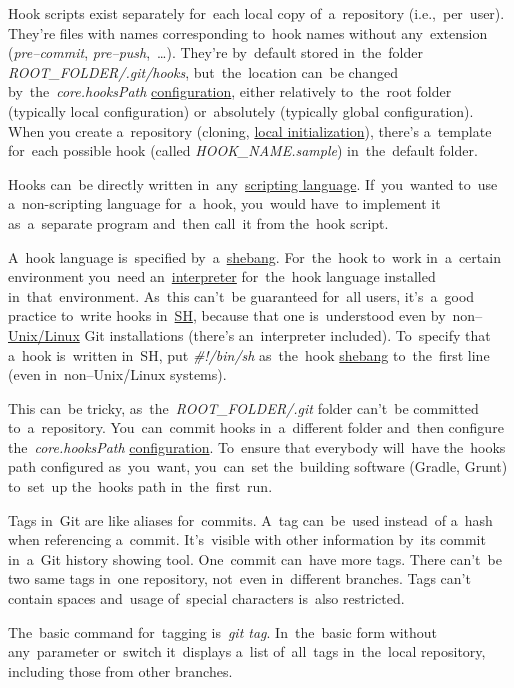 Hook scripts exist separately for~each local copy of~a~repository (i.e.,~per~user). They're files with names corresponding to~hook names without any~extension (\textit{pre--commit}, \textit{pre--push},~\dots). They're by~default stored in~the~folder \textit{ROOT\_FOLDER/.git/hooks}, but~the~location can~be changed by~the~\textit{core.hooksPath} \hyperref[gitconfig]{configuration}, either relatively to~the~root folder (typically local configuration) or~absolutely (typically global configuration). When you create a~repository (cloning, \hyperref[initrepo]{local initialization}), there's a~template for~each possible hook (called \textit{HOOK\_NAME.sample}) in~the~default folder.

Hooks can~be directly written in~any~\hyperref[scriptinglanguages]{scripting language}. If~you~wanted to~use a~non-scripting language for~a~hook, you~would have~to implement it as~a~separate program and~then call~it from the~hook script.

A~hook language is~specified by~a~\hyperref[shebang]{shebang}. For~the~hook to~work in~a~certain environment you~need an~\hyperref[compiledinterpretedlanguages]{interpreter} for~the~hook language installed in~that~environment. As~this can't~be guaranteed for~all users, it's~a~good practice to~write hooks in~\hyperref[shbash]{SH}, because that one is~understood even  by~non--\hyperref[linux]{Unix/Linux} Git installations (there's an~interpreter included). To~specify that a~hook is~written in~SH, put \textit{\#!/bin/sh} as~the~hook \hyperref[shebang]{shebang} to~the~first line (even in~non--Unix/Linux systems).

This can~be tricky, as~the~\textit{ROOT\_FOLDER/.git} folder can't~be committed to~a~repository. You~can~commit hooks in~a~different folder and~then configure the~\textit{core.hooksPath} \hyperref[gitconfig]{configuration}. To~ensure that everybody will~have the~hooks path configured as~you~want, you~can~set the~building software (Gradle, Grunt) to~set~up the~hooks path in~the~first~run.

Tags in~Git are like aliases for~commits. A~tag can~be~used instead~of a~hash when referencing a~commit. It's~visible with other information by~its commit in~a~Git history showing tool. One~commit can~have more tags. There can't~be two same tags in~one repository, not~even in~different branches. Tags can't contain spaces and~usage of~special characters is~also restricted.

The~basic command for~tagging is~\textit{git tag}. In~the~basic form without any~parameter or~switch it~displays a~list of~all~tags in~the~local repository, including those from other branches.

